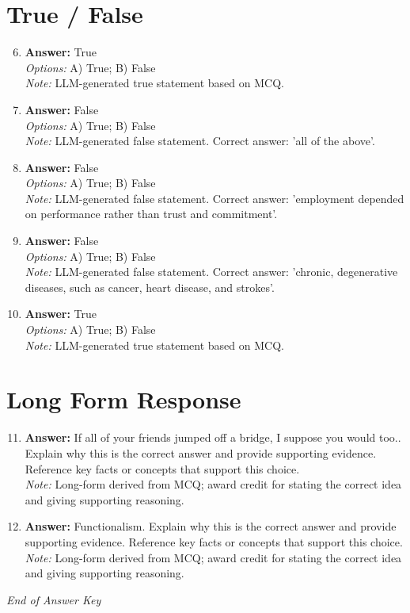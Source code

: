 \documentclass[12pt]{article}
\begin{document}
\section*{True / False}
\begin{enumerate}[label=\arabic*.]
\setcounter{enumi}{5}
\item \textbf{Answer:} True
\\ \textit{Options:} A) True; B) False
\\ \textit{Note:} LLM-generated true statement based on MCQ.
\item \textbf{Answer:} False
\\ \textit{Options:} A) True; B) False
\\ \textit{Note:} LLM-generated false statement. Correct answer: 'all of the above'.
\item \textbf{Answer:} False
\\ \textit{Options:} A) True; B) False
\\ \textit{Note:} LLM-generated false statement. Correct answer: 'employment depended on performance rather than trust and commitment'.
\item \textbf{Answer:} False
\\ \textit{Options:} A) True; B) False
\\ \textit{Note:} LLM-generated false statement. Correct answer: 'chronic, degenerative diseases, such as cancer, heart disease, and strokes'.
\item \textbf{Answer:} True
\\ \textit{Options:} A) True; B) False
\\ \textit{Note:} LLM-generated true statement based on MCQ.
\end{enumerate}

\section*{Long Form Response}
\begin{enumerate}[label=\arabic*.]
\setcounter{enumi}{10}
\item \textbf{Answer:} If all of your friends jumped off a bridge, I suppose you would too.. Explain why this is the correct answer and provide supporting evidence. Reference key facts or concepts that support this choice.
\\ \textit{Note:} Long-form derived from MCQ; award credit for stating the correct idea and giving supporting reasoning.
\item \textbf{Answer:} Functionalism. Explain why this is the correct answer and provide supporting evidence. Reference key facts or concepts that support this choice.
\\ \textit{Note:} Long-form derived from MCQ; award credit for stating the correct idea and giving supporting reasoning.
\end{enumerate}

\vfill
\noindent\textit{End of Answer Key}
\end{document}
